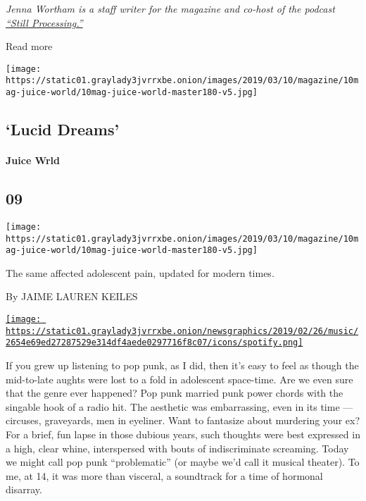 \emph{Jenna Wortham is a staff writer for the magazine and co-host of
the podcast
\href{https://www.nytimes3xbfgragh.onion/column/still-processing-podcast}{``Still
Processing.''}}

Read more

\texttt{[image: https://static01.graylady3jvrrxbe.onion/images/2019/03/10/magazine/10mag-juice-world/10mag-juice-world-master180-v5.jpg]}

\hypertarget{--lucid-dreams}{%
\subsection{\texorpdfstring{ `Lucid
Dreams'}{  `Lucid Dreams'}}\label{--lucid-dreams}}

\hypertarget{juice-wrld}{%
\paragraph{Juice Wrld}\label{juice-wrld}}

\hypertarget{09}{%
\subsection{09}\label{09}}

\texttt{[image: https://static01.graylady3jvrrxbe.onion/images/2019/03/10/magazine/10mag-juice-world/10mag-juice-world-master180-v5.jpg]}

The same affected adolescent pain, updated for modern times.

By JAIME LAUREN KEILES

\href{https://open.spotify.com/track/285pBltuF7vW8TeWk8hdRR}{\texttt{[image: https://static01.graylady3jvrrxbe.onion/newsgraphics/2019/02/26/music/2654e69ed27287529e314df4aede0297716f8c07/icons/spotify.png]}}

If you grew up listening to pop punk, as I did, then it's easy to feel
as though the mid-to-late aughts were lost to a fold in adolescent
space-time. Are we even sure that the genre ever happened? Pop punk
married punk power chords with the singable hook of a radio hit. The
aesthetic was embarrassing, even in its time --- circuses, graveyards,
men in eyeliner. Want to fantasize about murdering your ex? For a brief,
fun lapse in those dubious years, such thoughts were best expressed in a
high, clear whine, interspersed with bouts of indiscriminate screaming.
Today we might call pop punk ``problematic'' (or maybe we'd call it
musical theater). To me, at 14, it was more than visceral, a soundtrack
for a time of hormonal disarray.

